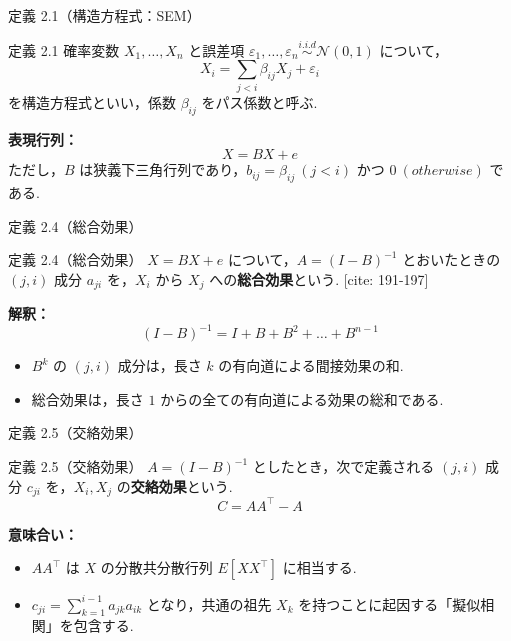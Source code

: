 \documentclass[dvipdfmx, 11pt]{beamer}
\begin{document}
\begin{frame}{定義 2.1（構造方程式：SEM）}
  \begin{block}{定義 2.1}
    確率変数 $X_1, \dots, X_n$ と誤差項 $\varepsilon_1, \dots, \varepsilon_n \stackrel{i.i.d}{\sim} \mathcal{N}(0,1)$ について，
    \[ X_i = \sum_{j < i} \beta_{ij} X_j + \varepsilon_i \]
    を構造方程式といい，係数 $\beta_{ij}$ をパス係数と呼ぶ.
  \end{block}
  \vspace{0.3cm}
  \textbf{表現行列：} 
  \[ X = BX + e \]
  ただし，$B$ は狭義下三角行列であり，$b_{ij} = \beta_{ij} \ (j < i)$ かつ $0 \ (otherwise)$ である. 
\end{frame}

\begin{frame}{定義 2.4（総合効果）}
  \begin{block}{定義 2.4（総合効果）}
    $X = BX + e$ について，$A = (I-B)^{-1}$ とおいたときの $(j, i)$ 成分 $a_{ji}$ を，$X_i$ から $X_j$ への\textbf{総合効果}という. [cite: 191-197]
  \end{block}
  \vspace{0.3cm}
  \textbf{解釈：} 
  \[ (I-B)^{-1} = I + B + B^2 + \dots + B^{n-1} \]
  \begin{itemize}
    \item $B^k$ の $(j, i)$ 成分は，長さ $k$ の有向道による間接効果の和.
    \item 総合効果は，長さ $1$ からの全ての有向道による効果の総和である.
  \end{itemize}
\end{frame}

\begin{frame}{定義 2.5（交絡効果）}
  \begin{block}{定義 2.5（交絡効果）}
    $A = (I-B)^{-1}$ としたとき，次で定義される $(j, i)$ 成分 $c_{ji}$ を，$X_i, X_j$ の\textbf{交絡効果}という. 
    \[ C = AA^\top - A \]
  \end{block}
  \vspace{0.3cm}
  \textbf{意味合い：}
  \begin{itemize}
    \item $AA^\top$ は $X$ の分散共分散行列 $E[XX^\top]$ に相当する. 
    \item $c_{ji} = \sum_{k=1}^{i-1} a_{jk} a_{ik}$ となり，共通の祖先 $X_k$ を持つことに起因する「擬似相関」を包含する. 
  \end{itemize}
\end{frame}
\end{document}
